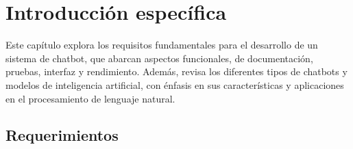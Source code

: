 
\chapter{Introducción específica}  
 
 
Este capítulo explora los requisitos fundamentales para el desarrollo de un sistema de chatbot, que abarcan aspectos funcionales, de documentación, pruebas, interfaz y rendimiento. Además, revisa los diferentes tipos de chatbots y modelos de inteligencia artificial, con énfasis en sus características y aplicaciones en el procesamiento de lenguaje natural.


\section{Requerimientos}

